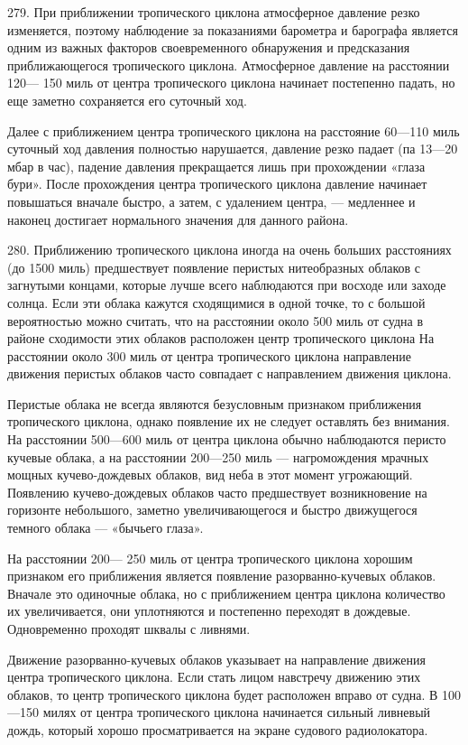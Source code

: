 279. При приближении тропического циклона атмосферное давление резко изменяется, поэтому наблюдение за показаниями барометра и барографа является одним из важных факторов своевременного обнаружения и предсказания приближающегося тропического циклона. Атмосферное давление на расстоянии 120— 150 миль от центра тропического циклона начинает постепенно падать, но еще заметно сохраняется его суточный ход.

Далее с приближением центра тропического циклона на расстояние 60—110 миль суточный ход давления полностью нарушается, давление резко падает (па 13—20 мбар в час), падение давления прекращается лишь при прохождении «глаза бури». После прохождения центра тропического циклона давление начинает повышаться вначале быстро, а затем, с удалением центра, — медленнее и наконец достигает нормального значения для данного района.

280. Приближению тропического циклона иногда на очень больших расстояниях (до 1500 миль) предшествует появление перистых нитеобразных облаков с загнутыми концами, которые лучше всего наблюдаются при восходе или заходе солнца. Если эти облака кажутся сходящимися в одной точке, то с большой вероятностью можно считать, что на расстоянии около 500 миль от судна в районе сходимости этих облаков расположен центр тропического циклона На расстоянии около 300 миль от центра тропического циклона направление движения перистых облаков часто совпадает с направлением движения циклона.

Перистые облака не всегда являются безусловным признаком приближения тропического циклона, однако появление их не следует оставлять без внимания. На расстоянии 500—600 миль от центра циклона обычно наблюдаются перисто кучевые облака, а на расстоянии 200—250 миль — нагромождения мрачных мощных кучево-дождевых облаков, вид неба в этот момент угрожающий. Появлению кучево-дождевых облаков часто предшествует возникновение на горизонте небольшого, заметно увеличивающегося и быстро движущегося темного облака — «бычьего глаза».

На расстоянии 200— 250 миль от центра тропического циклона хорошим признаком его приближения является появление разорванно-кучевых облаков. Вначале это одиночные облака, но с приближением центра циклона количество их увеличивается, они уплотняются и постепенно переходят в дождевые. Одновременно проходят шквалы с ливнями.

Движение разорванно-кучевых облаков указывает на направление движения центра тропического циклона. Если стать лицом навстречу движению этих облаков, то центр тропического циклона будет расположен вправо от судна. В 100—150 милях от центра тропического циклона начинается сильный ливневый дождь, который хорошо просматривается на экране судового радиолокатора.

